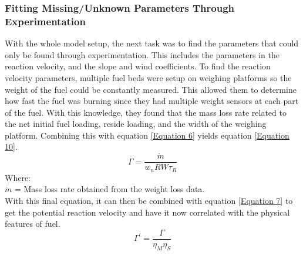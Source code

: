\documentclass{article}
\begin{document}
 \subsubsection{Fitting Missing/Unknown Parameters Through Experimentation}
 \indent With the whole model setup, the next task was to find the parameters that could only be found through experimentation. This includes the parameters in the reaction velocity, and the slope and wind coefficients. To find the reaction velocity parameters, multiple fuel beds were setup on weighing platforms so the weight of the fuel could be constantly measured. This allowed them to determine how fast the fuel was burning since they had multiple weight sensors at each part of the fuel. With this knowledge, they found that the mass loss rate related to the net initial fuel loading, reside loading, and the width of the weighing platform. Combining this with equation \ref{Equation 6} yields equation \ref{Equation 10}.
 \begin{equation}
 	\label{Equation 10}
 	\Gamma = \frac {\dot m } {w_n RW \tau _ R} 
 \end{equation}
 Where: \\
 $\dot m$ = Mass loss rate obtained from the weight loss data. \\
 \indent With this final equation, it can then be combined with equation \ref{Equation 7} to get the potential reaction velocity and have it now correlated with the physical features of fuel. 
 \begin{equation}
 	\label{Equation 11}
 	\Gamma ^ {'} = \frac {\Gamma} {\eta _ M \eta _ S}
 \end{equation}
 
\end{document}
